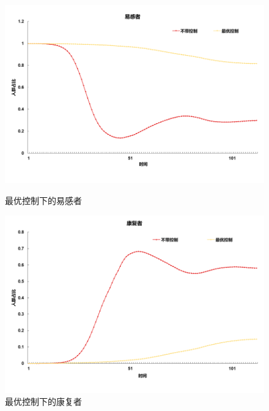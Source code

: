 \begin{figure}[htbp]
	\begin{minipage}{0.49\linewidth}
		\centering
		\includegraphics[width=0.9\linewidth]{fig/image008.png}
		\caption{最优控制下的易感者}
		\label{fig:ima3}%
	\end{minipage}
	\begin{minipage}{0.49\linewidth}
		\centering
		\includegraphics[width=0.9\linewidth]{fig/image012.png}
		\caption{最优控制下的康复者}
		\label{fig:ima4}%
	\end{minipage}


\end{figure}
